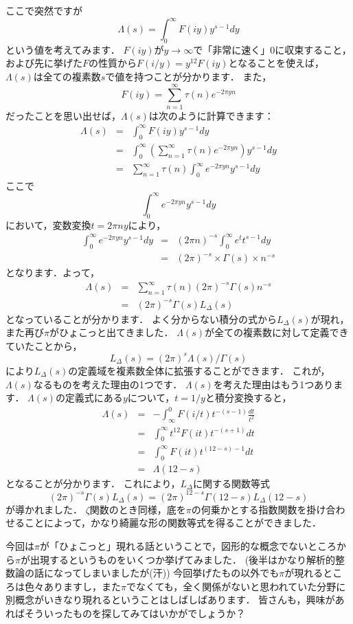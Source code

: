 ここで突然ですが
\[
\Lambda (s)=\int_{0}^{\infty}F(iy)y^{s-1}dy
\]
という値を考えてみます．
$F(iy)$が$y \rightarrow \infty$で「非常に速く」$0$に収束すること，および先に挙げた$F$の性質から$F(i/y)=y^{12}F(iy)$となることを使えば，$\Lambda(s)$は全ての複素数$s$で値を持つことが分かります．
また，
\[
	F(iy)=\sum_{n=1}^{\infty}\tau(n) e^{-2\pi yn}
\]
だったことを思い出せば，$\Lambda(s)$は次のように計算できます：
\begin{eqnarray*}
	\Lambda (s) & = & \int_{0}^{\infty}F(iy)y^{s-1}dy \\
	& = & \int_{0}^{\infty}\left(\sum_{n=1}^{\infty}\tau(n) e^{-2\pi yn} \right) y^{s-1}dy \\
	& = & \sum_{n=1}^{\infty}\tau(n) \int_{0}^{\infty}e^{-2\pi yn}y^{s-1}dy
\end{eqnarray*}
ここで
\[
	\int_{0}^{\infty}e^{-2 \pi yn}y^{s-1}dy
\]
において，変数変換$t=2 \pi ny$により，
\begin{eqnarray*}
	\int_{0}^{\infty}e^{-2 \pi yn}y^{s-1}dy & = & (2 \pi n)^{-s}\int_{0}^{\infty}e^t t^{s-1}dy \\
	&=& (2\pi)^{-s} \times \Gamma(s) \times n^{-s}
\end{eqnarray*}
となります．よって，
\begin{eqnarray*}
	\Lambda (s) &=& \sum_{n=1}^{\infty}\tau(n)(2 \pi)^{-s}\Gamma(s)n^{-s} \\
	&=& (2 \pi )^{-s}\Gamma(s)L_{\Delta}(s)
\end{eqnarray*}
となっていることが分かります．
よく分からない積分の式から$L_{\Delta}(s)$が現れ，また再び$\pi$がひょこっと出てきました．
$\Lambda(s)$が全ての複素数に対して定義できていたことから，
\[
	L_{\Delta}(s)=(2 \pi)^s \Lambda(s)/ \Gamma(s)
\]
により$L_{\Delta}(s)$の定義域を複素数全体に拡張することができます．
これが，$\Lambda(s)$なるものを考えた理由の1つです．
$\Lambda(s)$を考えた理由はもう1つあります．
$\Lambda(s)$の定義式にある$y$について，$t=1/y$と積分変換すると，
\begin{eqnarray*}
	\Lambda(s) &=& -\int_{\infty}^{0}F(i/t)t^{-(s-1)}\frac{dt}{t^2} \\
	&=& \int_{0}^{\infty}t^{12}F(it)t^{-(s+1)}dt \\
	&=& \int_{0}^{\infty}F(it)t^{(12-s)-1}dt \\
	&=& \Lambda(12-s)
\end{eqnarray*}
となることが分かります．
これにより，$L_{\Delta}$に関する関数等式
\[
	(2 \pi)^{-s}\Gamma(s)L_{\Delta}(s)=(2 \pi)^{12-s}\Gamma(12-s)L_{\Delta}(12-s)
\]
が導かれました．
$\zeta$関数のとき同様，底を$\pi$の何乗かとする指数関数を掛け合わせることによって，かなり綺麗な形の関数等式を得ることができました．

今回は$\pi$が「ひょこっと」現れる話ということで，図形的な概念でないところから$\pi$が出現するというものをいくつか挙げてみました．
(後半はかなり解析的整数論の話になってしまいましたが(汗))
今回挙げたもの以外でも$\pi$が現れるところは色々ありますし，また$\pi$でなくても，全く関係がないと思われていた分野に別概念がいきなり現れるということはしばしばあります．
皆さんも，興味があればそういったものを探してみてはいかがでしょうか？
